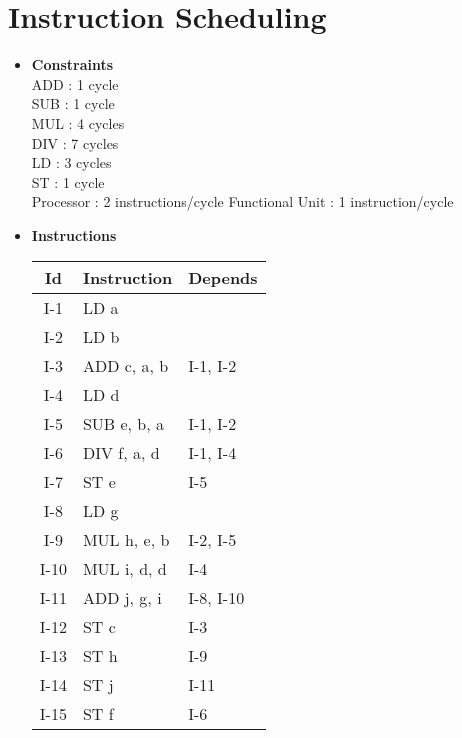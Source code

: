 \section{Instruction Scheduling}

\begin{itemize}

\item \textbf{Constraints} \\
  ADD : 1 cycle \\
  SUB : 1 cycle \\
  MUL : 4 cycles \\
  DIV : 7 cycles \\
  LD  : 3 cycles \\
  ST  : 1 cycle \\

  Processor : 2 instructions/cycle
  Functional Unit : 1 instruction/cycle

\item \textbf{Instructions}

\begin{table}[!ht]
\centering
\begin{tabular}{c|l|l}
  \toprule
  \toprule
  \textbf{Id} & \textbf{Instruction} & \textbf{Depends} \\
  \midrule
  I-1   &  LD a           &          \\ \hline
  I-2   &  LD b           &          \\ \hline
  I-3   &  ADD c, a, b    & I-1, I-2 \\ \hline
  I-4   &  LD d           &          \\ \hline
  I-5   &  SUB e, b, a    & I-1, I-2 \\ \hline
  I-6   &  DIV f, a, d    & I-1, I-4 \\ \hline
  I-7   &  ST e           & I-5      \\ \hline
  I-8   &  LD g           &          \\ \hline
  I-9   &  MUL h, e, b    & I-2, I-5 \\ \hline
  I-10  &  MUL i, d, d    & I-4      \\ \hline
  I-11  &  ADD j, g, i    & I-8, I-10 \\ \hline
  I-12  &  ST c           & I-3      \\ \hline
  I-13  &  ST h           & I-9      \\ \hline
  I-14  &  ST j           & I-11     \\ \hline
  I-15  &  ST f           & I-6      \\ \hline
  \bottomrule
\end{tabular}
\end{table}  
  

\end{itemize}
